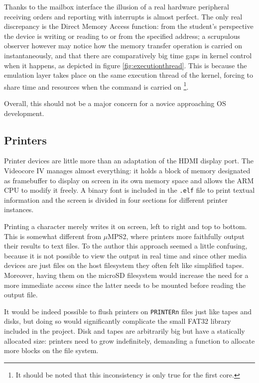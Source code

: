 \documentclass[12pt,a4paper,openright,twoside]{report}
\begin{document}
Thanks to the mailbox interface the illusion of a real hardware peripheral receiving
orders and reporting with interrupts is almost perfect. The only real discrepancy
is the Direct Memory Access function: from the student's perspective the device
is writing or reading to or from the specified address; a scrupulous observer
however may notice how the memory transfer operation is carried on instantaneously,
and that there are comparatively big time gaps in kernel control when it happens,
as depicted in figure \ref{fig:executionthread}.
This is because the emulation layer takes place on the same execution thread of
the kernel, forcing to share time and resources when the command is carried on 
\footnote{It should be noted that this inconsistency is only true for the first core.}.

Overall, this should not be a major concern for a novice approaching OS development.

\subsection{Printers}
Printer devices are little more than an adaptation of the HDMI display port.
The Videocore IV manages almost everything: it holds a block of memory designated
as framebuffer to display on screen in its own memory space and allows the ARM
CPU to modify it freely. A binary font is included in the {\tt .elf} file to 
print textual information and the screen is divided in four sections for different
printer instances.

Printing a character merely writes it on screen, left to right and top to bottom.
This is somewhat different from $\mu$MPS2, where printers more faithfully output
their results to text files. To the author this approach seemed a little confusing,
because it is not possible to view the output in real time and since other media
devices are just files on the host filesystem they often felt like simplified 
tapes. Moreover, having them on the microSD filesystem would increase the need
for a more immediate access since the latter needs to be mounted before reading
the output file.

It would be indeed possible to flush printers on {\tt PRINTERn} files just like
tapes and disks, but doing so would significantly complicate the small FAT32 
library included in the project. Disk and tapes are arbitrarily big but have a
statically allocated size: printers need to grow indefinitely, demanding a function
to allocate more blocks on the file system.
\end{document}
